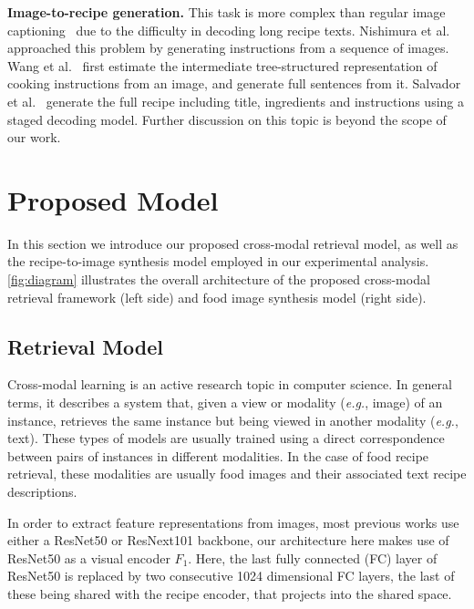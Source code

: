\documentclass[sigconf,nonacm]{acmart}
\def\eg{\emph{e.g.}} \def\Eg{\emph{E.g.}}
\begin{document}
\noindent\textbf{Image-to-recipe generation.}
This task is more 
complex
than regular image captioning~\cite{Vinyals2015,Karpathy2017} 
due to
the difficulty in decoding long recipe texts. Nishimura et al.~\cite{Nishimura1,Nishimura2} approached this problem by generating instructions from a sequence of images. Wang et al.~\cite{wang_eccv20} first estimate the intermediate tree-structured representation of cooking instructions from an image, and generate full sentences from it. Salvador et al.~\cite{salvador_2019} generate the full recipe including title, ingredients and instructions using a staged decoding model. Further discussion on this topic is beyond the scope of our work.

\section{Proposed Model}
In this section we introduce our proposed cross-modal retrieval model, as well as the recipe-to-image synthesis model employed in our experimental analysis. \autoref{fig:diagram} illustrates the overall architecture of the proposed cross-modal retrieval framework (left side) and food image synthesis model (right side).

\subsection{Retrieval Model}

Cross-modal learning is an active research topic in computer science. In general terms, it describes a system that, given a view or modality (\eg, image) of an instance, retrieves the same instance but being viewed in another modality (\eg, text). 
These types of models are usually trained using a direct correspondence between pairs of instances in different modalities. In the case of food recipe retrieval, these modalities are usually food images and their associated text recipe descriptions.

In order to extract feature representations from images, most previous works use either a ResNet50 or ResNext101 backbone, our architecture here makes use of ResNet50 as a visual encoder $F_1$. Here, the last fully connected (FC) layer of ResNet50 is replaced by two consecutive 1024 dimensional FC layers, the last of these being shared with the recipe encoder, that projects into the shared space.
\end{document}
